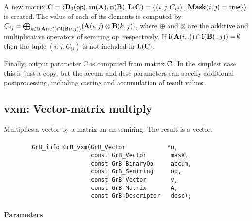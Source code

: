 {A new matrix ${\bf C} = \langle \bold{D}_3({\sf op}),
\bold{m}({\bf A}), \bold{n}({\bf B}), \bold{L}({\bf C}) = \{(i,j,C_{ij}) : {\bf Mask}(i,j)
= {\sf true} \} \rangle$ is created.  The value of each of its elements
is computed by $C_{ij} = \bigoplus_{k \in {\bf i}({\bf A}(i,:)) \cap
{\bf i}({\bf B}(:,j))} ({\bf A}(i,j) \otimes {\bf B}(k,j))$,
where $\oplus$ and $\otimes$ are the additive and multiplicative
operators of semiring {\sf op}, respectively.  If ${\bf i}({\bf A}(i,:)) \cap {\bf i}({\bf B}(:,j)) = \emptyset $ then the tuple $(i,j,C_{ij})$
is not included in $\bold{L}({\bf C})$.

Finally, output parameter {\sf C} is computed from matrix ${\bf C}$. In the 
simplest case this is just a copy, but the {\sf accum} and {\sf desc} parameters can
specify additional postprocessing, including casting and accumulation of result
values.
}


\subsection{{\sf vxm}: Vector-matrix multiply}

Multiplies a vector by a matrix on an semiring. The result is a vector.

\paragraph{\syntax}

\begin{verbatim}
        GrB_info GrB_vxm(GrB_Vector            *u,
                         const GrB_Vector       mask,
                         const GrB_BinaryOp     accum,
                         const GrB_Semiring     op,
                         const GrB_Vector       v, 
                         const GrB_Matrix       A,
                         const GrB_Descriptor   desc);
\end{verbatim}

\paragraph{Parameters}

